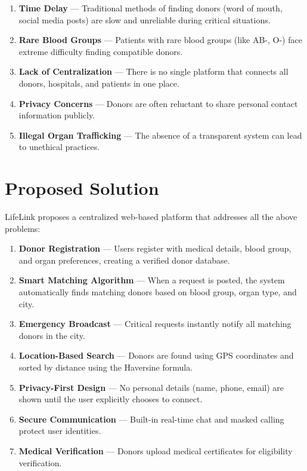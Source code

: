 \documentclass[12pt,a4paper]{article}
\begin{document}
\begin{enumerate}[leftmargin=*]
    \item \textbf{Time Delay} --- Traditional methods of finding donors (word of mouth, social media posts) are slow and unreliable during critical situations.
    \item \textbf{Rare Blood Groups} --- Patients with rare blood groups (like AB-, O-) face extreme difficulty finding compatible donors.
    \item \textbf{Lack of Centralization} --- There is no single platform that connects all donors, hospitals, and patients in one place.
    \item \textbf{Privacy Concerns} --- Donors are often reluctant to share personal contact information publicly.
    \item \textbf{Illegal Organ Trafficking} --- The absence of a transparent system can lead to unethical practices.
\end{enumerate}

\section{Proposed Solution}

LifeLink proposes a centralized web-based platform that addresses all the above problems:

\begin{enumerate}[leftmargin=*]
    \item \textbf{Donor Registration} --- Users register with medical details, blood group, and organ preferences, creating a verified donor database.
    \item \textbf{Smart Matching Algorithm} --- When a request is posted, the system automatically finds matching donors based on blood group, organ type, and city.
    \item \textbf{Emergency Broadcast} --- Critical requests instantly notify all matching donors in the city.
    \item \textbf{Location-Based Search} --- Donors are found using GPS coordinates and sorted by distance using the Haversine formula.
    \item \textbf{Privacy-First Design} --- No personal details (name, phone, email) are shown until the user explicitly chooses to connect.
    \item \textbf{Secure Communication} --- Built-in real-time chat and masked calling protect user identities.
    \item \textbf{Medical Verification} --- Donors upload medical certificates for eligibility verification.
\end{enumerate}
\end{document}
